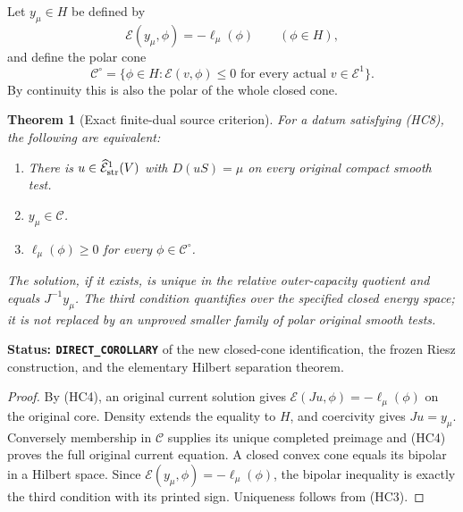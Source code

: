 \documentclass[11pt,a4paper]{article}
\numberwithin{equation}{section}
\newtheorem{theorem}{Theorem}[section]
\theoremstyle{definition}
\theoremstyle{remark}
\begin{document}
Let $y_\mu\in H$ be defined by
\[
                  \mathcal E(y_\mu,\phi)=-\ell_\mu(\phi)
                                   \qquad(\phi\in H),
 \tag{HC9}
\]
and define the polar cone
\[
 \mathcal C^\circ=
   \{\phi\in H:\mathcal E(v,\phi)\leq0
                       \text{ for every actual }v\in\mathcal E^1\}.
 \tag{HC10}
\]
By continuity this is also the polar of the whole closed cone.

\begin{theorem}[Exact finite-dual source criterion]
\label{thm:r11-strong-degree-one-source-criterion}
For a datum satisfying (HC8), the following are equivalent:
\begin{enumerate}
\item There is $u\in\widehat{\mathcal E}^1_{\rm str}(V)$
      with $D(uS)=\mu$ on every original compact smooth test.
\item $y_\mu\in\mathcal C$.
\item $\ell_\mu(\phi)\geq0$ for every $\phi\in\mathcal C^\circ$.
\end{enumerate}
The solution, if it exists, is unique in the relative
outer-capacity quotient and equals $J^{-1}y_\mu$.
The third condition quantifies over the specified closed
energy space; it is not replaced by an unproved smaller
family of polar original smooth tests.
\end{theorem}

\noindent\textbf{Status: \texttt{DIRECT\_COROLLARY}} of the new
closed-cone identification, the frozen Riesz construction, and
the elementary Hilbert separation theorem.

\begin{proof}
By (HC4), an original current solution gives
$\mathcal E(Ju,\phi)=-\ell_\mu(\phi)$ on the original core.
Density extends the equality to $H$, and coercivity gives
$Ju=y_\mu$. Conversely membership in $\mathcal C$ supplies
its unique completed preimage and (HC4) proves the full
original current equation. A closed convex cone equals its
bipolar in a Hilbert space. Since
$\mathcal E(y_\mu,\phi)=-\ell_\mu(\phi)$, the bipolar
inequality is exactly the third condition with its printed
sign. Uniqueness follows from (HC3).
\end{proof}
\end{document}
